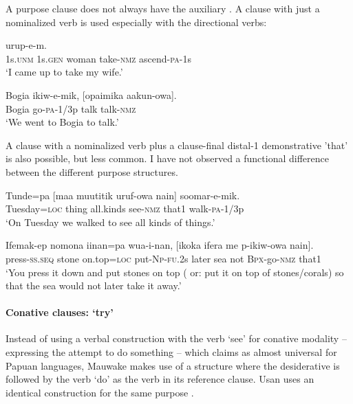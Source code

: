 A purpose clause does not always have the auxiliary . A clause with just a nominalized verb is used especially with the directional verbs: 

\ea%
\label{ex:8:x1659}
  urup-e-m.\\
1s.\textsc{unm} 1s.\textsc{gen} woman take-\textsc{nmz} ascend-\textsc{pa}-1s\\
\glt`I came up to take my wife.'
\z


\ea%
\label{ex:8:x1658}
\gll Bogia  ikiw-e-mik,  [opaimika  aakun-owa]. \\
Bogia  go-\textsc{pa}-1/3p talk talk-\textsc{nmz}\\
\glt`We went to Bogia to talk.'
\z


A clause with a nominalized verb plus a clause-final distal-1 demonstrative  'that' is also possible, but less common. I have not observed a functional difference between the different purpose structures.

\ea%
\label{ex:8:x1633}
\gll Tunde=pa  [maa  muutitik  uruf-owa  nain]  soomar-e-mik.\\
Tuesday=\textsc{loc} thing all.kinds see-\textsc{nmz} that1  walk-\textsc{pa}-1/3p\\
\glt`On Tuesday we walked to see all kinds of things.'
\z


\ea%
\label{ex:8:x1634}
\gll Ifemak-ep  nomona  iinan=pa  wua-i-nan,  [ikoka  ifera  me p-ikiw-owa  nain]. \\
press-\textsc{ss}.\textsc{seq} stone on.top=\textsc{loc} put-\textsc{Np}-\textsc{fu}.2s later sea not \textsc{Bpx}-go-\textsc{nmz} that1\\
\glt`You press it down and put stones on top ( or: put it on top of stones/corals) so that the sea would not later take it away.'
\z


\paragraph[Conative clauses: `try' ]{Conative clauses: `try'}  \label{sec:8.3.2.1.5}

Instead of using a verbal construction with the verb `see' for conative modality -- expressing the attempt to do something -- which \citet[152]{Foley1986} claims as almost universal for Papuan languages, Mauwake makes use of a structure where the desiderative is followed by the verb  `do' as the verb in its reference clause. Usan uses an identical construction for the same purpose \citep[258]{Reesink1987}. 

